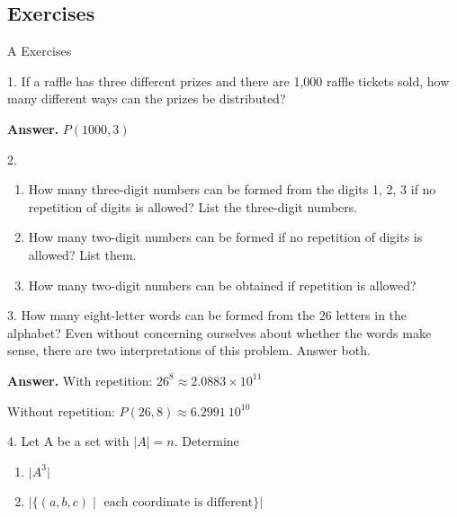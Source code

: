 \documentclass[10pt,]{book}
\theoremstyle{plain}
\theoremstyle{definition}
\theoremstyle{definition}
\theoremstyle{definition}
\begin{document}
\subsection[Exercises]{Exercises}\label{exercises-2}
\hypertarget{exercisegroup-3}{}\typeout{************************************************}
\typeout{************************************************}
A Exercises%
\begin{exercisegroup}
\item[1.]\hypertarget{exercise-21}{} If a raffle has three different prizes and there are 1,000 raffle tickets sold, how many different ways can the prizes be distributed?%
\par\smallskip
\par\smallskip
\noindent\textbf{Answer.}\hypertarget{answer-11}{}\quad
 \(P(1000,3)\)%
\item[2.]\hypertarget{exercise-22}{}\leavevmode%
\begin{enumerate}[label=\alph*]
\item\hypertarget{li-23}{} How many three-digit numbers can be formed from the digits 1, 2, 3 if no repetition of digits is allowed? List the three-digit numbers.%
\item\hypertarget{li-24}{}How many two-digit numbers can be formed if no repetition of digits is allowed? List them.%
\item\hypertarget{li-25}{}How many two-digit numbers can be obtained if repetition is allowed?%
\end{enumerate}
%
\par\smallskip
\item[3.]\hypertarget{exercise-23}{} How many eight-letter words can be formed from the 26 letters in the alphabet? Even without concerning ourselves about whether the words make sense, there are two interpretations of this problem. Answer both.%
\par\smallskip
\par\smallskip
\noindent\textbf{Answer.}\hypertarget{answer-12}{}\quad
With repetition: \(26^8\approx  2.0883\times 10^{11}\)%
\par
Without repetition: \(P(26,8) \approx 6.2991\ 10^{10}\) %
\item[4.]\hypertarget{exercise-24}{} Let A be a set with \( \lvert A \rvert = n \).
Determine %
\par
\leavevmode%
\begin{enumerate}[label=\alph*]
\item\hypertarget{li-26}{}\( \lvert A^3 \rvert \)%
\item\hypertarget{li-27}{}\( \lvert \{ ( a, b, c) \mid \textrm{ each coordinate is different} \} \rvert \)%

\end{enumerate}
\end{exercisegroup}
\end{document}
